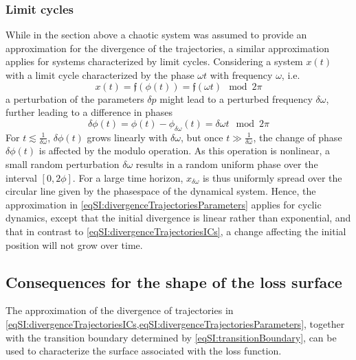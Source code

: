 \subsubsection{Limit cycles}
While in the section above a chaotic system was assumed to provide an approximation for the divergence of the trajectories, a similar approximation applies for systems characterized by limit cycles.
% 
Considering a system $x(t)$ with a limit cycle characterized by the phase $\omega t$ with frequency $\omega$, i.e.~
\begin{equation}
    x(t) = \mathfrak{f}\left(\phi(t)\right)= \mathfrak{f}\left(\omega t \right) \mod 2\pi
\end{equation}
% 
a perturbation of the parameters $\delta p$ might lead to a perturbed frequency $\delta\omega$, further leading to a difference in phases
\begin{equation}
	\delta \phi(t) = \phi(t) - \phi_{\delta\omega}(t) = \delta\omega t \mod 2\pi
\end{equation}
% 
For $t\lesssim \frac{1}{\delta \omega}$, $\delta \phi(t)$ grows linearly with $\delta \omega$, but once $t\gg \frac{1}{\delta \omega}$, the change of phase $\delta \phi(t)$ is affected by the modulo operation. As this operation is nonlinear, a small random perturbation $\delta\omega$ results in a random uniform phase over the interval $\left[0,2\phi\right]$. For a large time horizon, $x_{\delta\omega}$ is thus uniformly spread over the circular line given by the phasespace of the dynamical system. 
% 
% 
Hence, the approximation in \cref{eqSI:divergenceTrajectoriesParameters} applies for cyclic dynamics, except that the initial divergence is linear rather than exponential, and that in contrast to \cref{eqSI:divergenceTrajectoriesICs}, a change affecting the initial position will not grow over time.

\subsection{Consequences for the shape of the loss surface}

The approximation of the divergence of trajectories in \cref{eqSI:divergenceTrajectoriesICs,eqSI:divergenceTrajectoriesParameters}, together with the transition boundary determined by \cref{eqSI:transitionBoundary}, can be used to characterize the surface associated with the loss function.

